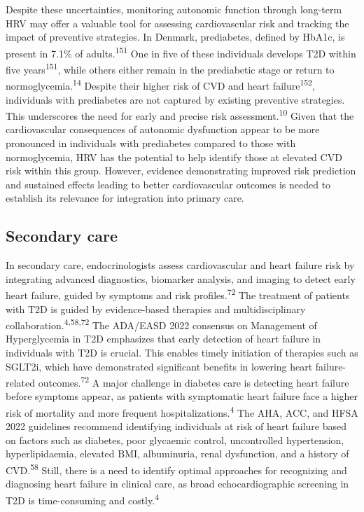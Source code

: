 \documentclass[
  a4paper,
  headsepline=true,
  open=left]{scrbook}
\begin{document}
Despite these uncertainties, monitoring autonomic function through
long-term HRV may offer a valuable tool for assessing cardiovascular
risk and tracking the impact of preventive strategies. In Denmark,
prediabetes, defined by HbA1c, is present in 7.1\% of
adults.\textsuperscript{151} One in five of these individuals develops
T2D within five years\textsuperscript{151}, while others either remain
in the prediabetic stage or return to normoglycemia.\textsuperscript{14}
Despite their higher risk of CVD and heart failure\textsuperscript{152},
individuals with prediabetes are not captured by existing preventive
strategies. This underscores the need for early and precise risk
assessment.\textsuperscript{10} Given that the cardiovascular
consequences of autonomic dysfunction appear to be more pronounced in
individuals with prediabetes compared to those with normoglycemia, HRV
has the potential to help identify those at elevated CVD risk within
this group. However, evidence demonstrating improved risk prediction and
sustained effects leading to better cardiovascular outcomes is needed to
establish its relevance for integration into primary care.

\hypertarget{secondary-care}{%
\subsection{Secondary care}\label{secondary-care}}

In secondary care, endocrinologists assess cardiovascular and heart
failure risk by integrating advanced diagnostics, biomarker analysis,
and imaging to detect early heart failure, guided by symptoms and risk
profiles.\textsuperscript{72} The treatment of patients with T2D is
guided by evidence-based therapies and multidisciplinary
collaboration.\textsuperscript{4,58,72} The ADA/EASD 2022 consensus on
Management of Hyperglycemia in T2D emphasizes that early detection of
heart failure in individuals with T2D is crucial. This enables timely
initiation of therapies such as SGLT2i, which have demonstrated
significant benefits in lowering heart failure-related
outcomes.\textsuperscript{72} A major challenge in diabetes care is
detecting heart failure before symptoms appear, as patients with
symptomatic heart failure face a higher risk of mortality and more
frequent hospitalizations.\textsuperscript{4} The AHA, ACC, and HFSA
2022 guidelines recommend identifying individuals at risk of heart
failure based on factors such as diabetes, poor glycaemic control,
uncontrolled hypertension, hyperlipidaemia, elevated BMI, albuminuria,
renal dysfunction, and a history of CVD.\textsuperscript{58} Still,
there is a need to identify optimal approaches for recognizing and
diagnosing heart failure in clinical care, as broad echocardiographic
screening in T2D is time-consuming and costly.\textsuperscript{4}
\end{document}
